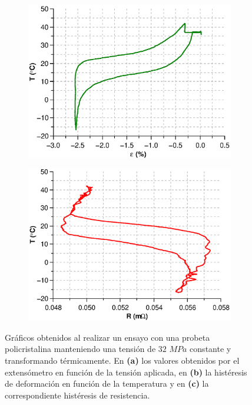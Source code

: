\documentclass[a4paper,12pt,fleqn,twoside,openany]{book}
\begin{document}
\begin{figure}
\begin{subfigure}{0.4\textwidth}
        \includegraphics[width=\textwidth]{Img/Resultados/Resistencia/EjTempDef.eps}
        \caption{}%
        \label{fig:EjTempDef}
    \end{subfigure}
        \begin{subfigure}{0.4\textwidth}
        \includegraphics[width=\textwidth]{Img/Resultados/Resistencia/EjTempRes.eps}
        \caption{}%
        \label{fig:EjTempRes}
    \end{subfigure}    
    \caption{Gráficos obtenidos al realizar un ensayo con una probeta policristalina manteniendo una tensión de $32$ $MPa$ constante y transformando térmicamente. En \textbf{(a)} los valores obtenidos por el extensómetro en función de la tensión aplicada, en \textbf{(b)} la histéresis de deformación en función de la temperatura y en \textbf{(c)} la correspondiente histéresis de resistencia.}
    \label{fig: Ejemplos6b}
    \end{figure}
\end{document}
